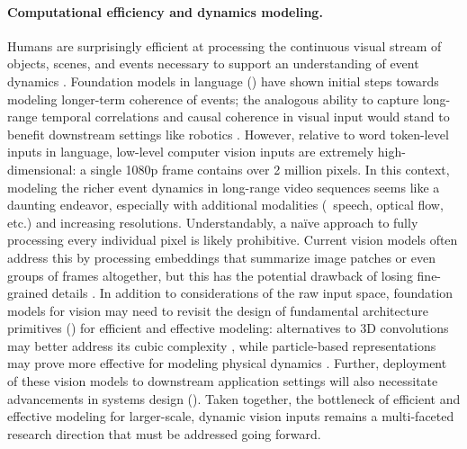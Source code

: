 \paragraph{Computational efficiency and dynamics modeling.} Humans are surprisingly efficient at processing the continuous visual stream of objects, scenes, and events necessary to support an understanding of event dynamics \cite{zacks2001perceiving, tversky2013event}.
Foundation models in language () have shown initial steps towards modeling longer-term coherence of events;
the analogous ability to capture long-range temporal correlations and causal coherence in visual input would stand to benefit downstream settings like robotics \citep[][]{dai2019transformer,alyamkin2019low, goel2020survey,feng2019computer}.
However, relative to word token-level inputs in language, low-level computer vision inputs are extremely high-dimensional: a single 1080p frame contains over 2 million pixels. In this context, modeling the richer event dynamics in long-range video sequences seems like a daunting endeavor, especially with additional modalities (\eg~speech, optical flow, etc.) and increasing resolutions. Understandably, a na\"{i}ve approach to fully processing every individual pixel is likely prohibitive. Current vision models \citep[\eg][]{radford2021learning,sun2019videobert,tan2019lxmert,kim2021vilt} often address this by processing embeddings that summarize image patches or even groups of frames altogether, but this has the potential drawback of losing fine-grained details \cite{ramesh2021zeroshot}. In addition to considerations of the raw input space, foundation models for vision may need to revisit the design of fundamental architecture primitives () for efficient and effective modeling: alternatives to 3D convolutions may better address its cubic complexity \cite{fanbuch2020rubiks,sitzmann2019scene}, while particle-based representations may prove more effective for modeling physical dynamics \cite{bear2021physion}. Further, deployment of these vision models to downstream application settings will also necessitate advancements in systems design (). Taken together, the bottleneck of efficient and effective modeling for larger-scale, dynamic vision inputs remains a multi-faceted research direction that must be addressed going forward.

